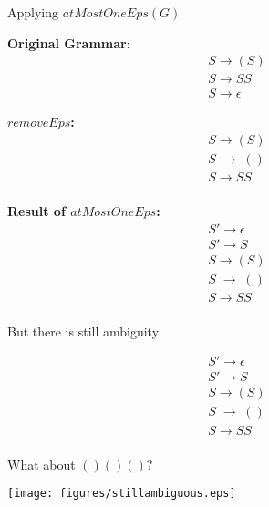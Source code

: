 \documentclass{prosper}%
\newcommand{\ra}{\mbox{$\;\rightarrow\;$}}
\begin{document}
\begin{slide}{Applying $atMostOneEps(G)$}
\begin{minipage}{6cm}
{\bf Original Grammar}:
\[
\begin{array}{l}
S\rightarrow (S)\\
S \rightarrow SS\\
S\rightarrow \epsilon
\end{array}
\]
\end{minipage}
\begin{minipage}{4cm}
{\bf  $removeEps$:}
\[
\begin{array}{l}
S\rightarrow (S)\\
S\ra ()\\
S \rightarrow SS\\
\end{array}
\]
\end{minipage}

\begin{minipage}{6cm}
{\bf Result of $atMostOneEps$:}
\[
\begin{array}{l}
S'\rightarrow \epsilon\\
S'\rightarrow S\\
S\rightarrow (S)\\
S\ra ()\\
S \rightarrow SS\\
\end{array}
\]

\end{minipage}
\end{slide}

\begin{slide}{But there is still ambiguity}
\begin{minipage}{5cm}
\[
\begin{array}{l}
S'\rightarrow \epsilon\\
S'\rightarrow S\\
S\rightarrow (S)\\
S\ra ()\\
S \rightarrow SS\\
\end{array}
\]
\end{minipage}
\begin{minipage}{6cm}
What about $()()()$?
\end{minipage}
\begin{center}
\texttt{[image: figures/stillambiguous.eps]}
\end{center}
\end{slide}
\end{document}
